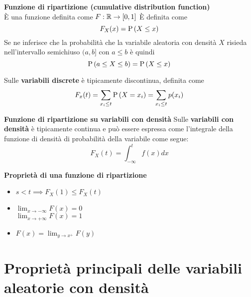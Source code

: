 \begin{defn}
    \textbf{Funzione di ripartizione (cumulative distribution function)} \\
    È una funzione definita come $ F : \mathbb{R} \to [0,1]$ È definita come
    \begin{equation*}
        F_X(x) = \text{P}\left(X \leq x\right)
    \end{equation*}
    Se ne inferisce che la probabilità che la variabile aleatoria con densità $
    X $ risieda nell'intervallo semichiuso $(a,b]$ con $ a \leq b $ è quindi
    \begin{equation*}
        \text{P}\left(a \leq X \leq b\right) = \text{P}\left(X \leq x\right)
    \end{equation*}

    Sulle \textbf{variabili discrete} è tipicamente discontinua, definita come
    \begin{equation*}
        F_x(t) = \sum_{x_i \leq t} \text{P}\left(X = x_i\right) = \sum_{x_i \leq t} p(x_i)
    \end{equation*}

    \textbf{Funzione di ripartizione su variabili con densità}
    Sulle \textbf{variabili con densità} è tipicamente continua e può essere
    espressa come l'integrale della funzione di densità di probabilità della
    variabile come segue:
    \begin{equation*}
        F_X(t) = \int_{-\infty}^{t} f(x) dx
    \end{equation*}
\end{defn}

\begin{defn}
    \textbf{Proprietà di una funzione di ripartizione} \\
    \begin{itemize}
        \item $s < t \implies F_X(1) \leq F_X(t)$ %
        \item $\lim_{x \to -\infty} F(x) = 0$ \\
            $\lim_{x \to +\infty} F(x) = 1$
        \item $F(x) = \lim_{y \to x^+} F(y)$
    \end{itemize}
\end{defn}

\section{Proprietà principali delle variabili aleatorie con densità}

